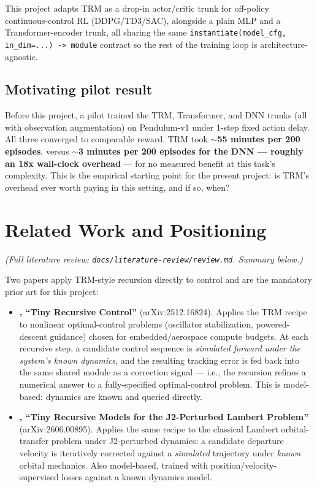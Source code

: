 \documentclass[11pt]{article}
\begin{document}
This project adapts TRM as a drop-in actor/critic trunk for off-policy continuous-control RL (DDPG/TD3/SAC), alongside a plain MLP and a Transformer-encoder trunk, all sharing the same \texttt{instantiate(model\_cfg, in\_dim=...) -> module} contract so the rest of the training loop is architecture-agnostic.

\subsection{Motivating pilot result}

Before this project, a pilot trained the TRM, Transformer, and DNN trunks (all with observation augmentation) on Pendulum-v1 under 1-step fixed action delay. All three converged to comparable reward. TRM took \textbf{$\sim$55 minutes per 200 episodes}, versus \textbf{$\sim$3 minutes per 200 episodes for the DNN --- roughly an 18x wall-clock overhead} --- for no measured benefit at this task's complexity. This is the empirical starting point for the present project: is TRM's overhead ever worth paying in this setting, and if so, when?

\section{Related Work and Positioning}
\label{sec:related}

\emph{(Full literature review: \texttt{docs/literature-review/review.md}. Summary below.)}

Two papers apply TRM-style recursion directly to control and are the mandatory prior art for this project:

\begin{itemize}
  \item \textbf{\citet{jainlinares2025trc}, ``Tiny Recursive Control''} (arXiv:2512.16824). Applies the TRM recipe to nonlinear optimal-control problems (oscillator stabilization, powered-descent guidance) chosen for embedded/aerospace compute budgets. At each recursive step, a candidate control sequence is \emph{simulated forward under the system's known dynamics}, and the resulting tracking error is fed back into the same shared module as a correction signal --- i.e., the recursion refines a numerical answer to a fully-specified optimal-control problem. This is model-based: dynamics are known and queried directly.
  \item \textbf{\citet{wijayatunga2026trmpl}, ``Tiny Recursive Models for the J2-Perturbed Lambert Problem''} (arXiv:2606.00895). Applies the same recipe to the classical Lambert orbital-transfer problem under J2-perturbed dynamics: a candidate departure velocity is iteratively corrected against a \emph{simulated} trajectory under \emph{known} orbital mechanics. Also model-based, trained with position/velocity-supervised losses against a known dynamics model.
\end{itemize}
\end{document}
